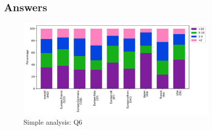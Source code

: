 
\subsection{Answers}


\begin{figure}[htb]
\begin{center}
\includegraphics[width=10cm]{../pdfs/Q6.pdf}
\caption{Simple analysis: Q6}
\label{fig:Q6}
\end{center}
\end{figure}

